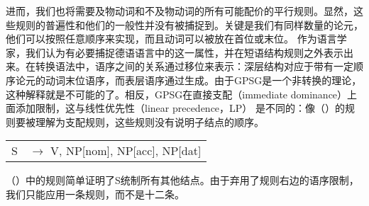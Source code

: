 \noindent
进而，我们也将需要及物动词和不及物动词的所有可能配价的平行规则。显然，这些规则的普遍性和他们的一般性并没有被捕捉到。关键是我们有同样数量的论元，他们可以按照任意顺序来实现，而且动词可以被放在首位或末位。
作为语言学家，我们认为有必要捕捉德语语言中的这一属性，并在短语结构规则之外表示出来。在转换语法中，语序之间的关系通过移位来表示：深层结构对应于带有一定顺序论元的动词末位语序，而表层语序通过\movealphac 生成。由于GPSG是一个非转换的理论，这种解释就是不可能的了。相反，GPSG在直接支配（immediate dominance）上面添加限制，这与线性优先性（linear precedence，LP） 是不同的：像（）的规则要被理解为支配规则，这些规则没有说明子结点的顺序\citep{Pullum82a}。
\ea
\begin{tabular}[t]{@{}l@{ }l}
S  & $\to$ V, NP[nom], NP[acc], NP[dat]\\
\end{tabular}
\z
（）中的规则简单证明了S统制所有其他结点。由于弃用了规则右边的语序限制，我们只能应用一条规则，而不是十二条。

